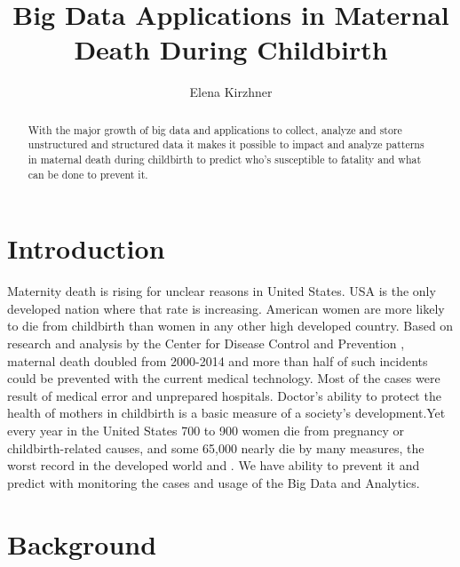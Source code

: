 \documentclass[sigconf]{acmart}
\begin{document}
\title{Big Data Applications in Maternal Death During Childbirth}


\author{Elena Kirzhner}


\renewcommand{\shortauthors}{B. Trovato et al.}


\begin{abstract}
With the major growth of big data and applications to collect, analyze and store unstructured and structured data it makes it possible to impact and analyze patterns in maternal death during childbirth to predict who's susceptible to fatality and what can be done to prevent it.
\end{abstract}



\maketitle

\section{Introduction}

Maternity death is rising for unclear reasons in United States. USA is the only developed nation where that rate is increasing. American women are more likely to die from childbirth than women in any other high developed country. Based on research and analysis by the Center for Disease Control and Prevention \cite{bacak2006state}, maternal death doubled from 2000-2014 and more than half of such incidents could be prevented with the current medical technology. Most of the cases were result of medical error and unprepared hospitals. Doctor’s ability to protect the health of mothers in childbirth is a basic measure of a society’s development.Yet every year in the United States 700 to 900 women die from pregnancy or childbirth-related causes, and some 65,000 nearly die by many measures, the worst record in the developed world \cite{world2012trends} and \cite{amnesty2010deadly}.
We have ability to prevent it and predict with monitoring the cases and usage of the Big Data and Analytics. 

\section{Background}
\end{document}

